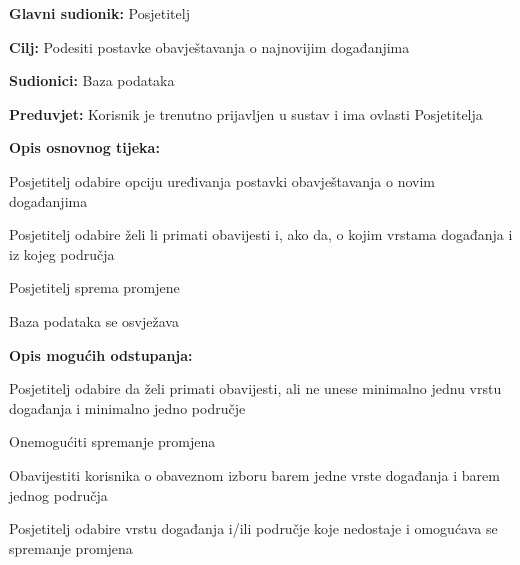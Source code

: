 					\noindent {}
					\begin{packed_item}
						
						\item \textbf{Glavni sudionik: } Posjetitelj
						\item  \textbf{Cilj:} Podesiti postavke obavještavanja o najnovijim događanjima
						\item  \textbf{Sudionici:} Baza podataka
						\item  \textbf{Preduvjet:} Korisnik je trenutno prijavljen u sustav i ima ovlasti Posjetitelja
						\item  \textbf{Opis osnovnog tijeka:}
						
						\item[] \begin{packed_enum}
							
							\item Posjetitelj odabire opciju uređivanja postavki obavještavanja o novim događanjima
							\item Posjetitelj odabire želi li primati obavijesti i, ako da, o kojim vrstama događanja i iz kojeg područja
							\item Posjetitelj sprema promjene
							\item Baza podataka se osvježava
							
						\end{packed_enum}
						
						\item  \textbf{Opis mogućih odstupanja:}
						
						\item[] \begin{packed_item}
							
							\item[2.a] Posjetitelj odabire da želi primati obavijesti, ali ne unese minimalno jednu vrstu događanja i minimalno jedno područje
							\item[] \begin{packed_enum}
								
								\item Onemogućiti spremanje promjena
								\item Obavijestiti korisnika o obaveznom izboru barem jedne vrste događanja i barem jednog područja
								\item Posjetitelj odabire vrstu događanja i/ili područje koje nedostaje i omogućava se spremanje promjena
								
							\end{packed_enum}
						\end{packed_item}
						
					\end{packed_item}
					
